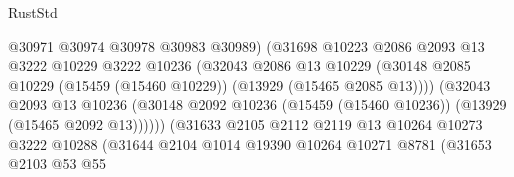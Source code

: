 \begin{lexlean}{RustStd}
\begin{coremodule}
                                          @30971
                                          @30974
                                          @30978
                                          @30983
                                          @30989)
                                        (@31698
                                          @10223
                                          @2086
                                          @2093
                                          @13
                                          @3222
                                          @10229
                                          @3222
                                          @10236
                                          (@32043
                                            @2086
                                            @13
                                            @10229
                                            (@30148
                                              @2085
                                              @10229
                                              (@15459 (@15460 @10229))
                                              (@13929 (@15465 @2085 @13))))
                                          (@32043
                                            @2093
                                            @13
                                            @10236
                                            (@30148
                                              @2092
                                              @10236
                                              (@15459 (@15460 @10236))
                                              (@13929 (@15465 @2092 @13))))))
                                      (@31633
                                        @2105
                                        @2112
                                        @2119
                                        @13
                                        @10264
                                        @10273
                                        @3222
                                        @10288
                                        (@31644
                                          @2104
                                          @1014
                                          @19390
                                          @10264
                                          @10271
                                          @8781
                                          (@31653
                                            @2103
                                            @53
                                            @55

\end{coremodule}
\end{lexlean}
